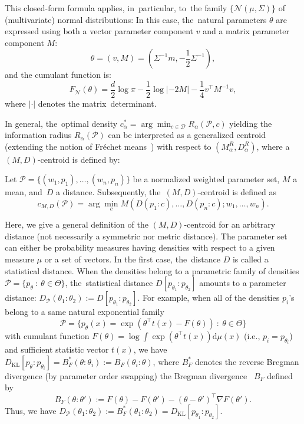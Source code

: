 \documentclass[entropy,article,accept,oneauthor,pdftex,entropy]{Definitions/mdpi}
\def\KL{\mathrm{KL}}
\def\dmu{\mathrm{d}\mu}
\def\calN{\mathcal{N}}
\def\calD{\mathcal{D}}
\def\calP{\mathcal{P}}
\def\dmu{\mathrm{d}\mu}
\begin{document}
\begin{paracol}{2}
This closed-form formula applies, in~particular, to~the family $\{\calN(\mu,\Sigma)\}$ of (multivariate) normal distributions:
In this case, the~natural parameters $\theta$ are expressed using both a vector parameter component $v$ and a matrix parameter component $M$:
\begin{equation}
\theta=(v,M)=\left(\Sigma^{-1}m,-\frac{1}{2}\Sigma^{-1}\right),
\end{equation}
and the cumulant function is:
\begin{equation}
F_{\calN}(\theta)= \frac{d}{2}\log\pi -\frac{1}{2}\log |-2M|-\frac{1}{4} v^\top M^{-1} v,
\end{equation}
where $|\cdot|$ denotes the matrix~determinant.


In general, the~optimal density $c^*_\alpha=\arg\min_{c\in\calD} R_\alpha(\calP,c)$ yielding the information radius $R_\alpha(\calP)$ can be 
interpreted as a generalized centroid (extending the notion of Fr\'echet means~\cite{Frechet-1948}) with respect to $(M^R_\alpha,D_\alpha^R)$, where a  $(M,D)$-centroid is defined by:

\begin{Definition}[$(M,D)$-centroid]\label{def:gencentroid}
Let $\calP=\{(w_1,p_1),\ldots,(w_n,p_n)\}$ be a normalized weighted parameter set, $M$ a mean, and~$D$ a distance.
Subsequently, the~$(M,D)$-centroid is defined as 
$$
c_{M,D}(\calP)=\arg\min_c M(D(p_1:c),\ldots,D(p_n:c);w_1,\ldots,w_n).
$$
\end{Definition}

Here, we give a general definition of the $(M,D)$-centroid for an arbitrary distance (not necessarily a symmetric nor metric distance).
The parameter set can either be probability measures having densities with respect to a given measure $\mu$ or a set of vectors.
In the first case, the~distance $D$ is called a statistical distance.
When the densities belong to a parametric family of densities $\calP=\{p_\theta\ :\ \theta\in\Theta\}$, the~statistical distance $D[p_{\theta_1}:p_{\theta_2}]$ amounts to a parameter distance: $D_{\calP}(\theta_1:\theta_2):=D[p_{\theta_1}:p_{\theta_2}]$.
For example, when all of the densities $p_i$'s belong to a same natural exponential family~\cite{EF-2014} 
$$
\calP=\{p_\theta(x)=\exp(\theta^\top t(x)-F(\theta))\ :\ \theta\in\Theta\}
$$ 
with cumulant function $F(\theta)=\log\int \exp(\theta^\top t(x))\dmu(x)$ (i.e., $p_i=p_{\theta_i}$) and sufficient statistic vector $t(x)$, we have 
$D_\KL[p_\theta:p_{\theta_i}]=B_F^*(\theta:\theta_i):=B_F(\theta_i:\theta)$, where $B_F^*$ denotes the reverse Bregman divergence (by parameter order swapping) the  Bregman divergence~\cite{BregmanKmeans-2005} $B_F$ defined by
\begin{equation}
B_F(\theta:\theta') := F(\theta)-F(\theta')-(\theta-\theta')^\top \nabla F(\theta').
\end{equation}
Thus, we have $D_{\calP}(\theta_1:\theta_2):=B_F^*(\theta_1:\theta_2)=D_\KL[p_{\theta_1}:p_{\theta_2}]$.


\end{paracol}
\end{document}
